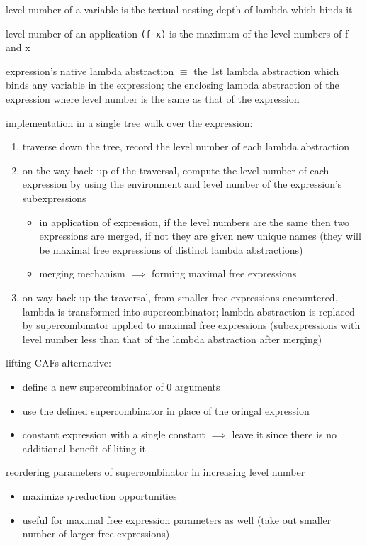 \documentclass[8pt]{extarticle}
\begin{document}
\begin{multicols*}{2}
level number of a variable is the textual nesting depth of lambda which binds it

level number of an application \verb|(f x)| is the maximum of the level numbers of f and x

expression's native lambda abstraction $\equiv$ the 1st lambda abstraction which binds any variable in the expression; the enclosing lambda abstraction of the expression where level number is the same as that of the expression

implementation in a single tree walk over the expression:
\begin{enumerate}
\item traverse down the tree, record the level number of each lambda abstraction
\item on the way back up of the traversal, compute the level number of each expression by using the environment and level number of the expression's subexpressions
  \begin{itemize}
  \item in application of expression, if the level numbers are the same then two expressions are merged, if not they are given new unique names (they will be maximal free expressions of distinct lambda abstractions)
  \item merging mechanism $\implies$ forming maximal free expressions
  \end{itemize}
\item on way back up the traversal, from smaller free expressions encountered, lambda is transformed into supercombinator; lambda abstraction is replaced by supercombinator applied to maximal free expressions (subexpressions with level number less than that of the lambda abstraction after merging)
\end{enumerate}

lifting CAFs alternative:
\begin{itemize}
\item define a new supercombinator of 0 arguments
\item use the defined supercombinator in place of the oringal expression
\item constant expression with a single constant $\implies$ leave it since there is no additional benefit of liting it
\end{itemize}

reordering parameters of supercombinator in increasing level number
\begin{itemize}
\item maximize $\eta$-reduction opportunities
\item useful for maximal free expression parameters as well (take out smaller number of larger free expressions)
\end{itemize}


\end{multicols*}
\end{document}
